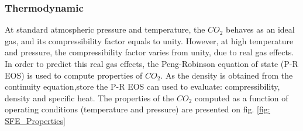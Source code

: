 \documentclass[../Parameter_fitting.tex]{subfiles}
\begin{document}
			\subsubsection{Thermodynamic} \label{CH: Thermodynamic}
			
			
			At standard atmospheric pressure and temperature, the $CO_2$ behaves as an ideal gas, and its compressibility factor equals to unity.  However, at high temperature and pressure, the compressibility factor varies from unity, due to real gas effects.  In order to predict this real gas effects, the Peng-Robinson equation of state (P-R EOS) is used to compute properties of $CO_2$. As the density is obtained from the continuity equation,store the P-R EOS can used to evaluate: compressibility, density and specific heat. The properties of the $CO_2$ computed as a function of operating conditions (temperature and pressure) are presented on fig. \ref{fig: SFE_Properties}
			
\end{document}
